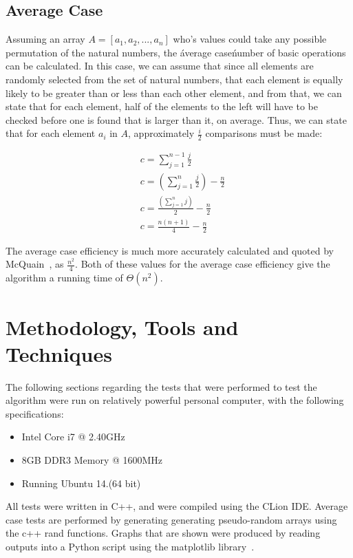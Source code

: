 \documentclass{article}
\begin{document}
    \subsection{Average Case}
        Assuming an array $A = [a_1, a_2, ..., a_n]$ who's values could take any possible permutation of the natural numbers, the \'average case\' number of basic operations can be calculated. In this case, we can assume that since all elements are randomly selected from the set of natural numbers, that each element is equally likely to be greater than or less than each other element, and from that, we can state that for each element, half of the elements to the left will have to be checked before one is found that is larger than it, on average. Thus, we can state that for each element $a_i$ in $A$, approximately $\frac{i}{2}$ comparisons must be made:

        \begin{align}
            & c = \sum_{j = 1}^{n - 1} \frac{j}{2} \\
            & c = (\sum_{j = 1}^{n} \frac{j}{2}) - \frac{n}{2}\\
            & c = \frac{(\sum_{j = 1}^{n} j)}{2} - \frac{n}{2}\\
            & c = \frac{n(n + 1)}{4} - \frac{n}{2}
        \end{align}

        The average case efficiency is much more accurately calculated and quoted by McQuain~\cite{McQuain2000}, as $\frac{n^2}{4}$. Both of these values for the average case efficiency give the algorithm a running time of $\Theta(n^2)$.

\section{Methodology, Tools and Techniques}
    The following sections regarding the tests that were performed to test the algorithm were run on relatively powerful personal computer, with the following specifications:
    \begin{itemize}
        \item Intel Core i7 @ 2.40GHz
        \item 8GB DDR3 Memory @ 1600MHz
        \item Running Ubuntu 14.(64 bit)
    \end{itemize}

    All tests were written in C++, and were compiled using the CLion IDE. Average case tests are performed by generating generating pseudo-random arrays using the c++ rand functions. Graphs that are shown were produced by reading outputs into a Python script using the matplotlib library~\cite{Hunter2007}.
\end{document}
